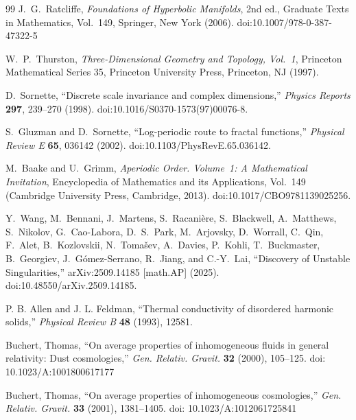 \begin{thebibliography}{99}
    J.~G.~Ratcliffe,
    \textit{Foundations of Hyperbolic Manifolds}, 2nd ed.,
    Graduate Texts in Mathematics, Vol.~149,
    Springer, New York (2006).
    doi:10.1007/978-0-387-47322-5

    W.~P.~Thurston,
    \textit{Three-Dimensional Geometry and Topology, Vol.~1},
    Princeton Mathematical Series 35,
    Princeton University Press, Princeton, NJ (1997).

    D.~Sornette,
    ``Discrete scale invariance and complex dimensions,''
    \emph{Physics Reports} \textbf{297}, 239--270 (1998).
    doi:10.1016/S0370-1573(97)00076-8.

    S.~Gluzman and D.~Sornette,
    ``Log-periodic route to fractal functions,''
    \emph{Physical Review E} \textbf{65}, 036142 (2002).
    doi:10.1103/PhysRevE.65.036142.

    M.~Baake and U.~Grimm,
    \emph{Aperiodic Order. Volume~1: A Mathematical Invitation},
    Encyclopedia of Mathematics and its Applications, Vol.~149
    (Cambridge University Press, Cambridge, 2013).
    doi:10.1017/CBO9781139025256.

    Y.~Wang, M.~Bennani, J.~Martens, S.~Racani\`ere, S.~Blackwell,
    A.~Matthews, S.~Nikolov, G.~Cao-Labora, D.~S.~Park, M.~Arjovsky,
    D.~Worrall, C.~Qin, F.~Alet, B.~Kozlovskii, N.~Toma\v{s}ev,
    A.~Davies, P.~Kohli, T.~Buckmaster, B.~Georgiev, J.~G\'omez-Serrano,
    R.~Jiang, and C.-Y.~Lai,
    ``Discovery of Unstable Singularities,''
    arXiv:2509.14185 [math.AP] (2025).
    doi:10.48550/arXiv.2509.14185.


    P. B. Allen and J. L. Feldman,
    ``Thermal conductivity of disordered harmonic solids,''
    \textit{Physical Review B}
    \textbf{48}
    (1993), 12581.


    Buchert, Thomas,
    ``On average properties of inhomogeneous fluids in general relativity: Dust cosmologies,''
    \textit{Gen. Relativ. Gravit.}
    \textbf{32}
    (2000), 105--125.
    doi: 10.1023/A:1001800617177

    Buchert, Thomas,
    ``On average properties of inhomogeneous cosmologies,''
    \textit{Gen. Relativ. Gravit.}
    \textbf{33}
    (2001), 1381--1405.
    doi: 10.1023/A:1012061725841



\end{thebibliography}
